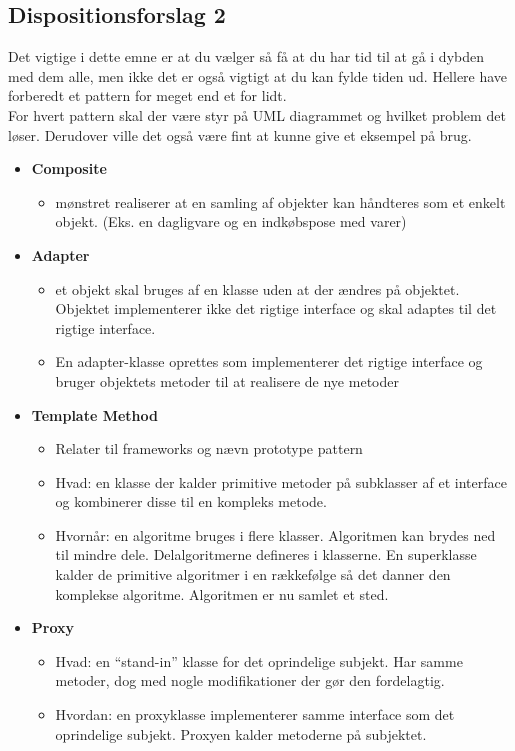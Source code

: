 \subsection{Dispositionsforslag 2}

Det vigtige i dette emne er at du vælger så få at du har tid til at gå i dybden med dem alle, men ikke det er også vigtigt at du kan fylde tiden ud. Hellere have forberedt et pattern for meget end et for lidt. \\
For hvert pattern skal der være styr på UML diagrammet og hvilket problem det løser. Derudover ville det også være fint at kunne give et eksempel på brug.

\begin{itemize}
    \item \textbf{Composite}
    \begin{itemize}
        \item mønstret realiserer at en samling af objekter kan håndteres som et enkelt objekt. (Eks. en dagligvare og en indkøbspose med varer)
    \end{itemize}
    
    \item \textbf{Adapter}
    \begin{itemize}
        \item et objekt skal bruges af en klasse uden at der ændres på objektet. Objektet implementerer ikke det rigtige interface og skal adaptes til det rigtige interface.
        \item En adapter-klasse oprettes som implementerer det rigtige interface og bruger objektets metoder til at realisere de nye metoder
    \end{itemize}
    
    \item \textbf{Template Method}
    \begin{itemize}
        \item Relater til frameworks og nævn prototype pattern
        \item Hvad: en klasse der kalder primitive metoder på subklasser af et interface og kombinerer disse til en kompleks metode.
        \item Hvornår: en algoritme bruges i flere klasser. Algoritmen kan brydes ned til mindre dele. Delalgoritmerne defineres i klasserne. En superklasse kalder de primitive algoritmer i en rækkefølge så det danner den komplekse algoritme. Algoritmen er nu samlet et sted.
    \end{itemize}
    
    \item \textbf{Proxy}
    \begin{itemize}
        \item Hvad: en “stand-in” klasse for det oprindelige subjekt. Har samme metoder, dog med nogle modifikationer der gør den fordelagtig.
        \item Hvordan: en proxyklasse implementerer samme interface som det oprindelige subjekt. Proxyen kalder metoderne på subjektet.
    \end{itemize}
    
\end{itemize}
